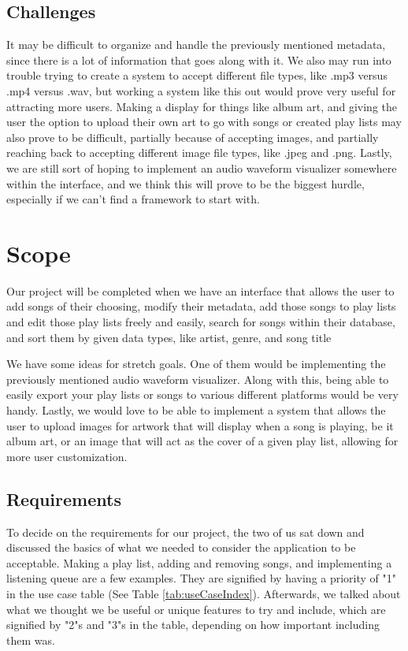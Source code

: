 \documentclass[10pt,conference,onecolumn,compsoc]{IEEEtran}
\begin{document}
\subsection{Challenges}
It may be difficult to organize and handle the previously mentioned metadata, since there is a lot of information that goes along with it. We also may run into trouble trying to create a system to accept different file types, like .mp3 versus .mp4 versus .wav, but working a system like this out would prove very useful for attracting more users. Making a display for things like album art, and giving the user the option to upload their own art to go with songs or created play lists may also prove to be difficult, partially because of accepting images, and partially reaching back to accepting different image file types, like .jpeg and .png. Lastly, we are still sort of hoping to implement an audio waveform visualizer somewhere within the interface, and we think this will prove to be the biggest hurdle, especially if we can't find a framework to start with.


\section{Scope}
Our project will be completed when we have an interface that allows the user to add songs of their choosing, modify their metadata, add those songs to play lists and edit those play lists freely and easily, search for songs within their database, and sort them by given data types, like artist, genre, and song title

We have some ideas for stretch goals. One of them would be implementing the previously mentioned audio waveform visualizer. Along with this, being able to easily export your play lists or songs to various different platforms would be very handy. Lastly, we would love to be able to implement a system that allows the user to upload images for artwork that will display when a song is playing, be it album art, or an image that will act as the cover of a given play list, allowing for more user customization.

\subsection{Requirements}
To decide on the requirements for our project, the two of us sat down and discussed the basics of what we needed to consider the application to be acceptable. Making a play list, adding and removing songs, and implementing a listening queue are a few examples. They are signified by having a priority of "1" in the use case table (See Table \ref{tab:useCaseIndex}). Afterwards, we talked about what we thought we be useful or unique features to try and include, which are signified by "2"s and "3"s in the table, depending on how important including them was.
\end{document}

